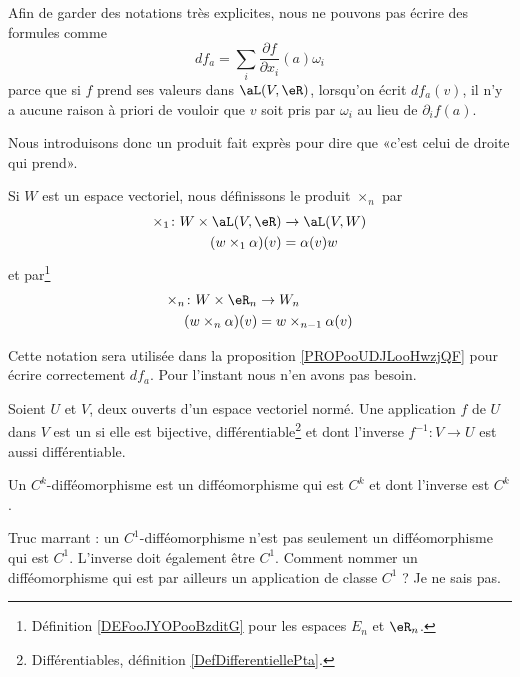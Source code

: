 Afin de garder des notations très explicites, nous ne pouvons pas écrire des formules comme
\[
	df_a=\sum_i\frac{ \partial f }{ \partial x_i }(a)\omega_i
\]
parce que si \( f\) prend ses valeurs dans \( \aL(V,\eR)\), lorsqu'on écrit \( df_a(v)\), il n'y a aucune raison à priori de vouloir que \( v\) soit pris par \( \omega_i\) au lieu de \( \partial_if(a)\).

Nous introduisons donc un produit fait exprès pour dire que «c'est celui de droite qui prend».
\begin{definition}       \label{DEFooLULCooYjBEaZ}
	Si \( W\) est un espace vectoriel, nous définissons le produit \( \times_n\) par
	\begin{equation}
		\begin{aligned}
			\times_1\colon W\times \aL(V,\eR) & \to \aL(V,W) \\
			(w\times_1\alpha)(v)              & =\alpha(v)w
		\end{aligned}
	\end{equation}
	et par\footnote{Définition \ref{DEFooJYOPooBzditG} pour les espaces \( E_n\) et \( \eR_n\).}
	\begin{equation}
		\begin{aligned}
			\times_n\colon W\times \eR_n & \to W_n                  \\
			(w\times_n\alpha)(v)         & =w\times_{n-1} \alpha(v)
		\end{aligned}
	\end{equation}
\end{definition}
Cette notation sera utilisée dans la proposition \ref{PROPooUDJLooHwzjQF} pour écrire correctement \( df_a\). Pour l'instant nous n'en avons pas besoin.

\begin{definition}[difféomorphisme]      \label{DefAQIQooYqZdya}
	Soient \( U\) et \( V\), deux ouverts d'un espace vectoriel normé. Une application \( f\) de \( U\) dans \( V\) est un  si elle est bijective, différentiable\footnote{Différentiables, définition \ref{DefDifferentiellePta}.} et dont l'inverse \( f^{-1}:V\to U \) est aussi différentiable.

	Un \( C^k\)-difféomorphisme est un difféomorphisme qui est \( C^k\) et dont l'inverse est \( C^k\).
\end{definition}

\begin{normaltext}
	Truc marrant : un \( C^1\)-difféomorphisme n'est pas seulement un difféomorphisme qui est \( C^1\). L'inverse doit également être \( C^1\). Comment nommer un difféomorphisme qui est par ailleurs un application de classe \( C^1\) ? Je ne sais pas.
\end{normaltext}

